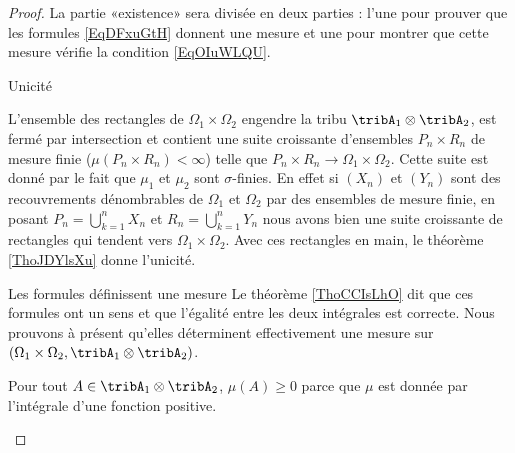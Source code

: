 \begin{proof}
    La partie «existence» sera divisée en deux parties : l'une pour prouver que les formules \eqref{EqDFxuGtH} donnent une mesure et une pour montrer que cette mesure vérifie la condition \eqref{EqOIuWLQU}.
    \begin{subproof}
    \item[Unicité]
        
    L'ensemble des rectangles de \( \Omega_1\times \Omega_2\) engendre la tribu \( \tribA_1\otimes\tribA_2\), est fermé par intersection et contient une suite croissante d'ensembles \( P_n\times R_n\) de mesure finie (\( \mu(P_n\times R_n)<\infty\)) telle que \( P_n\times R_n\to \Omega_1\times \Omega_2\). Cette suite est donné par le fait que \( \mu_1\) et \( \mu_2\) sont \( \sigma\)-finies. En effet si \( (X_n)\) et \( (Y_n)\) sont des recouvrements dénombrables de \( \Omega_1\) et \( \Omega_2\) par des ensembles de mesure finie, en posant \( P_n=\bigcup_{k=1}^nX_n\) et \( R_n=\bigcup_{k=1}^nY_n\) nous avons bien une suite croissante de rectangles qui tendent vers \( \Omega_1\times \Omega_2\). Avec ces rectangles en main, le théorème \ref{ThoJDYlsXu} donne l'unicité.

\item[Les formules définissent une mesure]
    Le théorème \ref{ThoCCIsLhO} dit que ces formules ont un sens et que l'égalité entre les deux intégrales est correcte. Nous prouvons à présent qu'elles déterminent effectivement une mesure sur \( (\Omega_1\times\Omega_2,\tribA_1\otimes \tribA_2)\).

    Pour tout \( A\in \tribA_1\otimes \tribA_2\), \( \mu(A)\geq 0\) parce que \( \mu\) est donnée par l'intégrale d'une fonction positive.


\end{subproof}
\end{proof}
